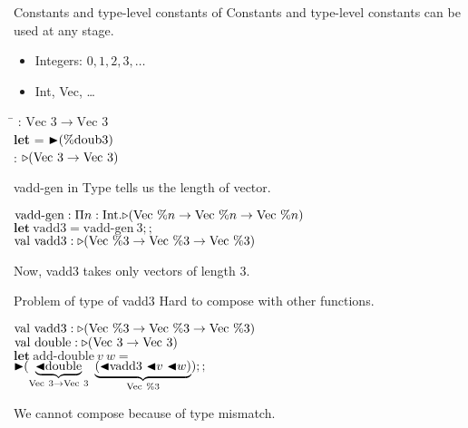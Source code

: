 \documentclass[dvipdfmx,aspectratio=169, 20pt]{beamer}
\begin{document}
\begin{frame}[fragile]{Constants and type-level constants of \LMD}
    Constants and type-level constants can be used at any stage.
    \begin{itemize}
        \item Integers: \( 0,1,2,3,\dots \)
        \item Int, Vec, \dots
    \end{itemize}

    \begin{tabbing}
        \hspace{5mm} \=  : \( \text{Vec }3 \to \text{Vec }3 \) \\[2mm]
        \> \textbf{let }  = \( {\mathop{\blacktriangleright}} (\% \text{doub3}) \) \\
        \>  : \( {\mathop{\triangleright}} ( \text{Vec }3 \to \text{Vec }3) \)
    \end{tabbing}
\end{frame}

\begin{frame}[fragile]{vadd-gen in \LMD}
    Type tells us the length of vector.
    \newcommand{\Vn}{\text{Vec}\ \%n}
    \newcommand{\Vt}{\text{Vec}\ \%3}
    \begin{tabbing}
        \hspace{5mm} \= \( \text{vadd-gen} : \Pi n:\I. \TW (\Vn \to \Vn \to \Vn) \) \\[2mm]
        \> \( \textbf{let}\ \text{vadd3} = \text{vadd-gen}\ 3;; \) \\
        \> \( \text{val}\ \text{vadd3} : \TW (\Vt \to \Vt \to \Vt) \) \\[2mm]
    \end{tabbing}
    Now, vadd3 takes only vectors of length 3.
\end{frame}

\begin{frame}[fragile]{Problem of type of vadd3}
    Hard to compose with other functions.
    \newcommand{\Vn}{\text{Vec}\ \%n}
    \newcommand{\Vpt}{\text{Vec}\ \%3}
    \newcommand{\Vt}{\text{Vec}\ 3}
    \begin{tabbing}
        \hspace{5mm} \= \( \text{val}\ \text{vadd3} : \TW (\Vpt \to \Vpt \to \Vpt) \) \\
        \> \( \text{val}\ \text{double} : \TW (\Vt \to \Vt) \) \\[2mm]
        \> \( \textbf{let}\ \text{add-double}\ v\ w = \) \\
        \> \hspace{5mm} \( \TB (\underbrace{\TBL\text{double}}_{\Vt \to \Vt}\ \underbrace{(\TBL \text{vadd3}\ \TBL v\ \TBL w)}_{\Vpt});; \) \\
    \end{tabbing}
    We cannot compose because of type mismatch.
\end{frame}
\end{document}
